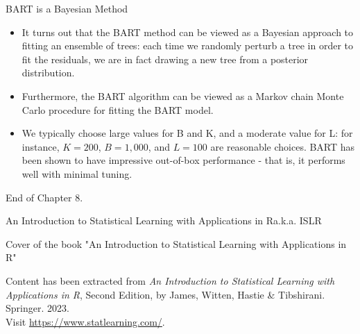 \documentclass[aspectratio=169, 11pt]{beamer}
\begin{document}
\begin{frame}{BART is a Bayesian Method}
\begin{itemize}
    \item It turns out that the BART method can be viewed as a Bayesian approach to fitting an ensemble of trees: each time we randomly perturb a tree in order to fit the residuals, we are in fact drawing a new tree from a posterior distribution.
    \item Furthermore, the BART algorithm can be viewed as a Markov chain Monte Carlo procedure for fitting the BART model.
    \item We typically choose large values for B and K, and a moderate value for L: for instance, $K=200$, $B=1,000$, and $L=100$ are reasonable choices. BART has been shown to have impressive out-of-box performance - that is, it performs well with minimal tuning.
\end{itemize}
\end{frame}

\begin{frame}{}
    \centering
    \Huge End of Chapter 8.
\end{frame}

\begin{frame}{An Introduction to Statistical Learning with Applications in R}{a.k.a. ISLR}
    \centering
    \begin{tcolorbox}[colback=LightGray,title=Figure]
    Cover of the book "An Introduction to Statistical Learning with Applications in R"
    \end{tcolorbox}
    \vspace{4mm}
    {
        \tiny
        Content has been extracted from \textit{An Introduction to Statistical Learning with Applications in R}, Second Edition, by James, Witten, Hastie \& Tibshirani. Springer. 2023.\\
        Visit \url{https://www.statlearning.com/}.\\
    }
\end{frame}
\end{document}
